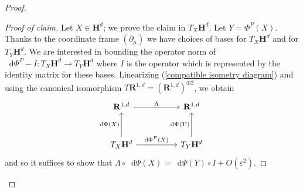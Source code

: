 \documentclass[reqno,10pt]{amsart}
\newcommand{\RR}{\mathbf{R}}
\newcommand{\Hyp}{\mathbf H}
\newcommand*\dif{\mathop{}\!\mathrm{d}}
\theoremstyle{definition}
\numberwithin{equation}{section}
\begin{document}
\begin{proof}
\begin{proof}[Proof of claim]
Let $X \in \Hyp^d$; we prove the claim in $T_X \Hyp^d$.
Let $Y = \Phi^P(X)$.
Thanks to the coordinate frame $(\partial_\mu)$ we have choices of bases for $T_X \Hyp^d$ and for $T_Y \Hyp^d$.
We are interested in bounding the operator norm of $\dif \Phi^P - I: T_X \Hyp^d \to T_Y \Hyp^d$ where $I$ is the operator which is represented by the identity matrix for these bases.
Linearizing (\ref{compatible isometry diagram}) and using the canonical isomorphism $T\RR^{1, d} = (\RR^{1, d})^{\oplus 2}$, we obtain
$$\begin{tikzcd}[column sep=50pt, row sep=30pt]
\RR^{1, d} \arrow[r, "\Lambda"] & \RR^{1, d} \\
T_X \Hyp^d \arrow[u, "\dif \Psi(X)"] \arrow[r, "\dif \Phi^P(X)"] & T_Y \Hyp^d \arrow[u, "\dif \Psi(Y)"]
\end{tikzcd}$$
and so it suffices to show that $\Lambda \circ \dif \Psi(X) = \dif \Psi(Y) \circ I + O(\varepsilon^2)$.


\end{proof}
\end{proof}
\end{document}
